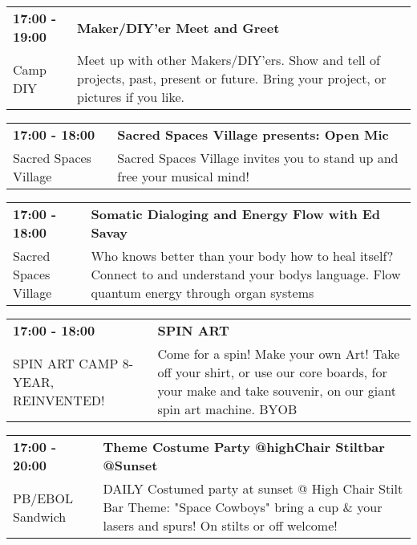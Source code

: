 \begin{tabular}{ p{1in} p{2.2in} }
    \textbf{17:00 - 19:00} & \textbf{Maker/DIY'er Meet and Greet} \\
    Camp DIY \newline  & Meet up with other Makers/DIY'ers. Show and tell of projects, past, present or future.  Bring your project, or pictures if you like. \\
    \hline 
\end{tabular}
    
\begin{tabular}{ p{1in} p{2.2in} }
    \textbf{17:00 - 18:00} & \textbf{Sacred Spaces Village presents: Open Mic} \\
    Sacred Spaces Village \newline  & Sacred Spaces Village invites you to stand up and free your musical mind! \\
    \hline 
\end{tabular}
    
\begin{tabular}{ p{1in} p{2.2in} }
    \textbf{17:00 - 18:00} & \textbf{Somatic Dialoging and Energy Flow with Ed Savay} \\
    Sacred Spaces Village \newline  & Who knows better than your body how to heal itself? Connect to and understand your bodys language. Flow quantum energy through organ systems \\
    \hline 
\end{tabular}
    
\begin{tabular}{ p{1in} p{2.2in} }
    \textbf{17:00 - 18:00} & \textbf{SPIN ART} \\
    SPIN ART CAMP 8-YEAR, REINVENTED! \newline  & Come for a spin! Make your own Art! Take off your shirt, or use our core boards, for your make and take souvenir, on our giant spin art machine. BYOB \\
    \hline 
\end{tabular}
    
\begin{tabular}{ p{1in} p{2.2in} }
    \textbf{17:00 - 20:00} & \textbf{Theme Costume Party @highChair Stiltbar @Sunset } \\
    PB/EBOL Sandwich \newline  & DAILY Costumed party at sunset @ High Chair Stilt Bar Theme: "Space Cowboys" bring a cup \& your lasers and spurs! On stilts or off welcome! \\
    \hline 
\end{tabular}
    
